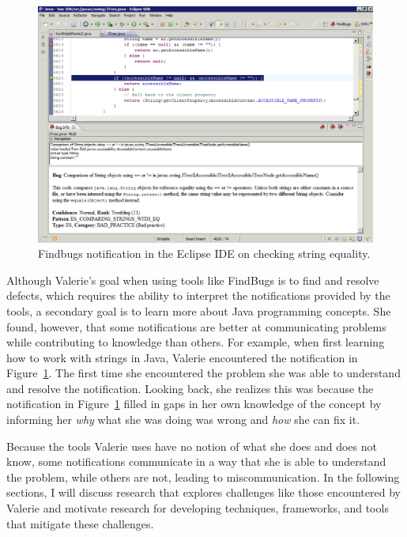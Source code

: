 \documentclass{llncs}
\begin{document}

\begin{figure} 
	\centering
	\includegraphics[width=\textwidth]{figs/eclipse-2.png}
	\caption{Findbugs notification in the Eclipse IDE on checking string equality.}
	\label{fig:eclipse2}
\end{figure}

Although Valerie's goal when using tools like FindBugs is to find and resolve defects, which requires the ability to interpret the notifications provided by the tools, a secondary goal is to learn more about Java programming concepts. She found, however, that some notifications are better at communicating problems while contributing to knowledge than others. For example, when first learning how to work with strings in Java, Valerie encountered the notification in Figure~\ref{fig:eclipse2}. The first time she encountered the problem she was able to understand and resolve the notification. Looking back, she realizes this was because the notification in Figure~\ref{fig:eclipse2} filled in gaps in her own knowledge of the concept by informing her \emph{why} what she was doing was wrong and \emph{how} she can fix it.

Because the tools Valerie uses have no notion of what she does and does not know, some notifications communicate in a way that she is able to understand the problem, while others are not, leading to  miscommunication. In the following sections, I will discuss research that explores challenges like those encountered by Valerie and motivate research for developing techniques, frameworks, and tools that mitigate these challenges.
\end{document}
